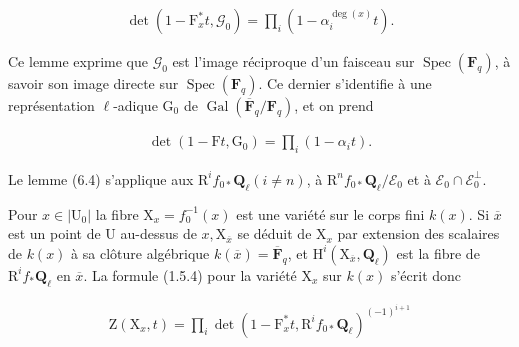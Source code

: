\documentclass[10pt,leqno]{article}
\begin{document}
\begin{equation*}\begin{gathered}\operatorname{det}(1- \mathrm{F}_{x}^{*}t,\mathcal{G} _{0})=\prod _{i}(1- \alpha _{i}^{\operatorname{deg}(x)}t).\end{gathered}\end{equation*}

\clearpage

\label{physical-25}\setcounter{page}{296}

\noindent Ce lemme exprime que \(\mathcal{G} _{0}\) est l’image réciproque d’un faisceau sur \(\operatorname{Spec}(\mathbf{F}_{q})\), à savoir son image directe sur \(\operatorname{Spec}(\mathbf{F}_{q})\). Ce dernier s’identifie à une représentation \(\ell \)-adique \(\mathrm{G}_{0}\) de \(\operatorname{Gal}(\overline{\mathbf{F}}_{q}/\mathbf{F}_{q})\), et on prend\par

\begin{equation*}\begin{gathered}\operatorname{det}(1- \mathrm{F}t,\mathrm{G}_{0})=\prod _{i}(1- \alpha _{i} t).\end{gathered}\end{equation*}

\noindent Le lemme (6.4) s’applique aux \(\mathrm{R}^{i} f_{0*}\mathbf{Q}_{\ell } (i\ne n)\), à \(\mathrm{R}^{n} f_{0*}\mathbf{Q}_{\ell }/\mathcal{E} _{0}\) et à \(\mathcal{E} _{0}\cap \mathcal{E} _{0}^{\perp }\).\par

\noindent Pour \(x\in |\mathrm{U}_{0}|\) la fibre \(\mathrm{X}_{x}=f_{0}^{- 1}(x)\) est une variété sur le corps fini \(k(x)\). Si \(\overline{x}\) est un point de \(\mathrm{U}\) au-dessus de \(x, \mathrm{X}_{\overline{x}}\) se déduit de \(\mathrm{X}_{x}\) par extension des scalaires de \(k(x)\) à sa clôture algébrique \(k(\overline{x})=\overline{\mathbf{F}}_{q}\), et \(\mathrm{H}^{i}(\mathrm{X}_{\overline{x}},\mathbf{Q}_{\ell })\) est la fibre de \(\mathrm{R}^{i} f_{*}\mathbf{Q}_{\ell }\) en \(\overline{x}\). La formule (1.5.4) pour la variété \(\mathrm{X}_{x}\) sur \(k(x)\) s’écrit donc\par

\begin{equation*}\begin{gathered}\mathrm{Z}(\mathrm{X}_{x},t)=\prod _{i} \operatorname{det}(1- \mathrm{F}_{x}^{*}t,\mathrm{R}^{i} f_{0*}\mathbf{Q}_{\ell })^{(- 1)^{i+1}}\end{gathered}\end{equation*}
\end{document}
